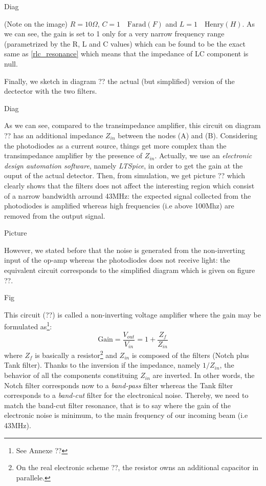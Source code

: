 \documentclass[12pt]{report}
\begin{document}
Diag

(Note on the image) $R = 10\Omega$, $C = 1 \quad\textrm{Farad}(F)$ and $L = 1 \quad\textrm{Henry}(H)$. As we can see, the gain is set to 1 only for a very narrow frequency range (parametrized by the R, L and C values) which can be found to be the exact same as \eqref{rlc_resonance} which means that the impedance of LC component is null.

Finally, we sketch in diagram ?? the actual (but simplified) version of the dectector with the two filters.

Diag

As we can see, compared to the transimpedance amplifier, this circuit on diagram ?? has an additional impedance $Z_{in}$ between the nodes (A) and (B). Considering the photodiodes as a current source, things get more complex than the transimpedance amplifier by the presence of $Z_{in}$. Actually, we use an \textit{electronic design automation software}, namely \textit{LTSpice}, in order to get the gain at the ouput of the actual detector. Then, from simulation, we get picture ?? which clearly shows that the filters does not affect the interesting region which consist of a narrow bandwidth arround 43MHz: the expected signal collected from the photodiodes is amplified whereas high frequencies (i.e above 100Mhz) are removed from the output signal.

Picture

However, we stated before that the noise is generated from the non-inverting input of the op-amp whereas the photodiodes does not receive light: the equivalent circuit corresponds to the simplified diagram which is given on figure ??.

Fig

This circuit (??) is called a non-inverting voltage amplifier where the gain may be formulated as\footnote{See Annexe ??}:
\begin{equation}
\textrm{Gain} = \frac{V_{out}}{V_{in}} = 1 + \frac{Z_{f}}{Z_{in}}
\end{equation}
where $Z_f$ is basically a resistor\footnote{On the real electronic scheme ??, the resistor owns an additional capacitor in parallele.} and $Z_{in}$ is composed of the filters (Notch plus Tank filter). Thanks to the inversion if the impedance, namely $1/Z_{in}$, the behavior of all the components constituing $Z_{in}$ are inverted. In other words, the Notch filter corresponds now to a \textit{band-pass} filter whereas the Tank filter corresponds to a \textit{band-cut} filter for the electronical noise. Thereby, we need to match the band-cut filter resonance, that is to say where the gain of the electronic noise is minimum, to the main frequency of our incoming beam (i.e 43MHz).
\end{document}
